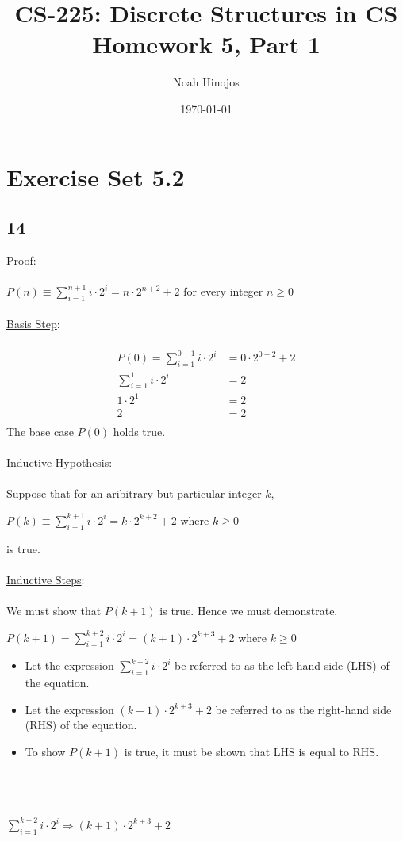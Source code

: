 \documentclass[12pt]{article}
\title{
  \textbf{CS-225: Discrete Structures in CS} \\
  Homework 5, Part 1
  }
\author{Noah Hinojos}
\date{\today}
\newcommand{\xlist}[1]{
    \begin{itemize}
        \renewcommand{\labelitemi}{$\centerdot$}
        #1
    \end{itemize}
    \newblock
    \\ \\
}
\newcommand{\xproof}[1]{
    \underline{Proof}:
    \\ \\
    #1
    \\ \\
}
\newcommand{\xbasisstep}{
    \underline{Basis Step}:
    \\ \\
}
\newcommand{\xinductivehypothesis}{
    \underline{Inductive Hypothesis}:
    \\ \\
}
\newcommand{\xinductivestep}{
    \underline{Inductive Steps}:
    \\ \\
}
\begin{document}
\maketitle


\section*{Exercise Set 5.2}


\subsection*{14}
\xproof{$P(n) \equiv \sum_{i=1}^{n+1}i \cdot 2^i = n \cdot 2^{n+2} + 2$ for every integer $n \geq 0$}
\xbasisstep
\begin{align*}
  P(0) = \sum_{i=1}^{0+1}i \cdot 2^i &= 0 \cdot 2^{0+2} + 2 \\
  \sum_{i=1}^{1}i \cdot 2^i &= 2 \\
  1\cdot2^1 &= 2 \\
  2 &= 2\\
\end{align*}
The base case $P(0)$ holds true.
\\ \\
\xinductivehypothesis
Suppose that for an aribitrary but particular integer $k$,
\begin{center}
  $P(k) \equiv \sum_{i=1}^{k+1}i \cdot 2^i = k \cdot 2^{k+2} + 2$ where $k \geq 0$
\end{center}
is true.
\\ \\
\xinductivestep
We must show that $P(k+1)$ is true. Hence we must demonstrate,
\begin{center}
  $P(k+1) = \sum_{i=1}^{k+2}i \cdot 2^i = (k+1) \cdot 2^{k+3} + 2$ where $k \geq 0$
\end{center}
\xlist{
  \item Let the expression $\sum_{i=1}^{k+2}i \cdot 2^i$ be referred to as the left-hand side (LHS) of the equation.
  \item Let the expression $(k+1) \cdot 2^{k+3} + 2$ be referred to as the right-hand side (RHS) of the equation.
  \item To show $P(k+1)$ is true, it must be shown that LHS is equal to RHS.

}
\\
$\sum_{i=1}^{k+2}i \cdot 2^i \Rightarrow (k+1) \cdot 2^{k+3} + 2$
\end{document}
